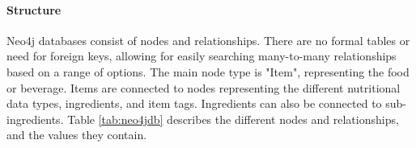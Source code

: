 \documentclass[thesis]{fputhesis}
\newcommand{\ra}[1]{\renewcommand{\arraystretch}{#1}}
\begin{document}
\begin{body}
\paragraph{Structure}
Neo4j databases consist of nodes and relationships. There are no formal tables or need for foreign keys, allowing for easily searching many-to-many relationships based on a range of options. The main node type is "Item", representing the food or beverage. Items are connected to nodes representing the different nutritional data types, ingredients, and item tags. Ingredients can also be connected to sub-ingredients. Table \ref{tab:neo4jdb} describes the different nodes and relationships, and the values they contain.
\begin{table}[h]\centering
\ra{1.2}
\caption{Neo4j database nodes and relations}\label{tab:neo4jdb}
\end{table}


\end{body}
\end{document}
